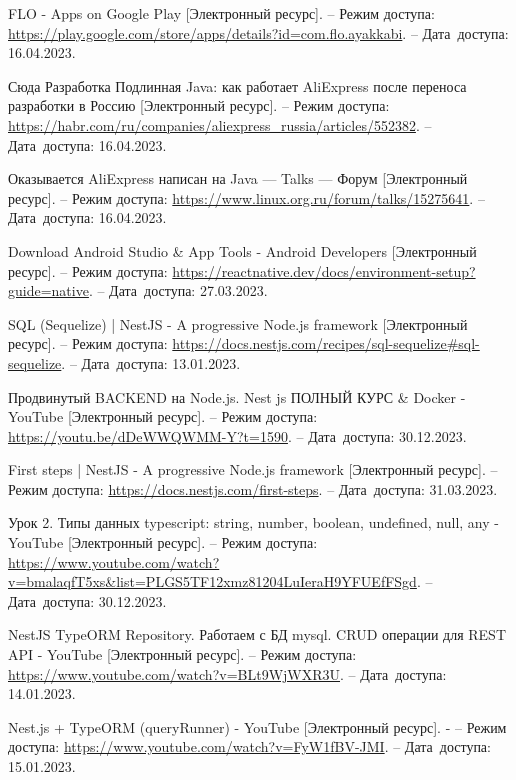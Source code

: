 \begin{thebibliography}{}
    FLO - Apps on Google Play
    [Электронный ресурс].
    -- Режим доступа: \url{https://play.google.com/store/apps/details?id=com.flo.ayakkabi}.
    -- Дата~доступа: 16.04.2023.

    Сюда Разработка Подлинная Java: как работает AliExpress после переноса разработки в Россию
    [Электронный ресурс].
    -- Режим доступа: \url{https://habr.com/ru/companies/aliexpress_russia/articles/552382}.
    -- Дата~доступа: 16.04.2023.

    Оказывается AliExpress написан на Java — Talks — Форум
    [Электронный ресурс].
    -- Режим доступа: \url{https://www.linux.org.ru/forum/talks/15275641}.
    -- Дата~доступа: 16.04.2023.

    Download Android Studio \& App Tools - Android Developers
    [Электронный ресурс].
    -- Режим доступа: \url{https://reactnative.dev/docs/environment-setup?guide=native}.
    -- Дата~доступа: 27.03.2023.

    SQL (Sequelize) | NestJS - A progressive Node.js framework
    [Электронный ресурс].
    -- Режим доступа: \url{https://docs.nestjs.com/recipes/sql-sequelize#sql-sequelize}.
    -- Дата~доступа: 13.01.2023.

    Продвинутый BACKEND на Node.js. Nest js ПОЛНЫЙ КУРС \& Docker - YouTube
    [Электронный ресурс].
    -- Режим доступа: \url{https://youtu.be/dDeWWQWMM-Y?t=1590}.
    -- Дата~доступа: 30.12.2023.

    First steps | NestJS - A progressive Node.js framework
    [Электронный ресурс].
    -- Режим доступа: \url{https://docs.nestjs.com/first-steps}.
    -- Дата~доступа: 31.03.2023.

    Урок 2. Типы данных typescript: string, number, boolean, undefined, null, any - YouTube
    [Электронный ресурс].
    -- Режим доступа: \url{https://www.youtube.com/watch?v=bmalaqfT5xs&list=PLGS5TF12xmz81204LuIeraH9YFUEfFSgd}.
    -- Дата~доступа: 30.12.2023.

    NestJS TypeORM Repository. Работаем с БД mysql. CRUD операции для REST API - YouTube
    [Электронный ресурс].
    -- Режим доступа: \url{https://www.youtube.com/watch?v=BLt9WjWXR3U}.
    -- Дата~доступа: 14.01.2023.

    Nest.js + TypeORM (queryRunner) - YouTube
    [Электронный ресурс]. -
    -- Режим доступа: \url{https://www.youtube.com/watch?v=FyW1fBV-JMI}.
    -- Дата~доступа: 15.01.2023.


\end{thebibliography}
